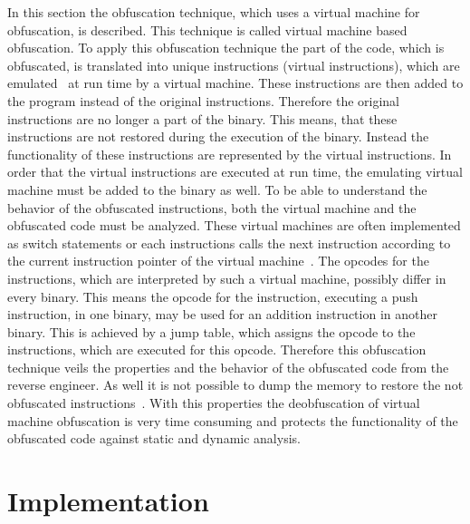 \documentclass[10pt,twoside,a4paper,bibliography=totoc]{scrbook}
\begin{document}
In this section the obfuscation technique, which uses a virtual machine for obfuscation, is described. 
This technique is called virtual machine based obfuscation.
To apply this obfuscation technique the part of the code, which is 
obfuscated, is translated into unique instructions (virtual instructions), which are emulated~\cite{malobfs}
at run time by a virtual machine.
These instructions are then added to the program instead of the original instructions.
Therefore the original instructions are no longer a part of the binary.
This means, that these instructions are not restored during the execution of the
binary.
Instead the functionality of these instructions are represented by the virtual instructions.
In order that the virtual instructions are executed at run time, the emulating virtual machine 
must be added to the binary as well.
To be able to understand the behavior of the obfuscated instructions, both the virtual
machine and the obfuscated code must be analyzed.
These virtual machines are often implemented as switch statements or each instructions 
calls the next instruction according to the current instruction pointer of the virtual 
machine~\cite{rolles}.
The opcodes for the instructions, which are interpreted by such a virtual machine, possibly differ
in every binary.
This means the opcode for the instruction, executing a push instruction, in one binary,
may be used for an addition instruction in another binary. 
This is achieved by a jump table, which assigns the opcode to the instructions, which 
are executed for this opcode.
Therefore this obfuscation technique veils the properties and the behavior 
of the obfuscated code from the reverse engineer.
As well it is not possible to dump the memory to restore the not obfuscated 
instructions~\cite{createvmi}.
With this properties the deobfuscation of virtual machine obfuscation is very time 
consuming and protects the functionality of the obfuscated code against static and
dynamic analysis. 


%
% 


\chapter{Implementation}
\label{sec3:implementation}
\end{document}
